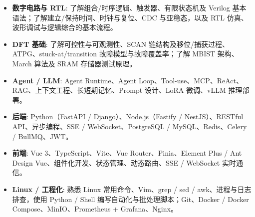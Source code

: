 \documentclass[zh]{resume}
\begin{document}
\begin{itemize}
  \item \textbf{数字电路与 RTL}: 了解组合/时序逻辑、触发器、有限状态机及 Verilog 基本语法；了解建立/保持时间、时钟与复位、CDC 与亚稳态，以及 RTL 仿真、波形调试与逻辑综合的基本流程。
  \item \textbf{DFT 基础}: 了解可控性与可观测性、SCAN 链结构及移位/捕获过程、ATPG、stuck-at/transition 故障模型与故障覆盖率；了解 MBIST 架构、March 算法及 SRAM 存储器测试原理。
  \item \textbf{Agent / LLM}: Agent Runtime、Agent Loop、Tool-use、MCP、ReAct、RAG、上下文工程、长短期记忆、Prompt 设计、LoRA 微调、vLLM 推理部署。
  \item \textbf{后端}: Python（FastAPI / Django）、Node.js（Fastify / NestJS）、RESTful API、异步编程、SSE / WebSocket、PostgreSQL / MySQL、Redis、Celery / BullMQ、JWT。
  \item \textbf{前端}: Vue 3、TypeScript、Vite、Vue Router、Pinia、Element Plus / Ant Design Vue、组件化开发、状态管理、动态路由、SSE / WebSocket 实时通信。
  \item \textbf{Linux / 工程化}: 熟悉 Linux 常用命令、Vim、grep / sed / awk、进程与日志排查，使用 Python / Shell 编写自动化与批处理脚本；Git、Docker / Docker Compose、MinIO、Prometheus + Grafana、Nginx。
\end{itemize}
\end{document}
